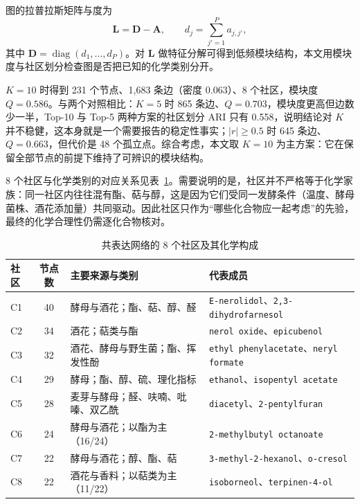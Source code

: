 ﻿\documentclass[UTF8,a4paper,zihao=-4]{ctexart}
\numberwithin{figure}{section}
\numberwithin{table}{section}
\numberwithin{equation}{section}
\newcommand{\file}[1]{\texttt{#1}}
\newcommand{\bA}{\bm{A}}
\newcommand{\bD}{\bm{D}}
\newcommand{\bL}{\bm{L}}
\begin{document}
图的拉普拉斯矩阵与度为
\begin{equation}
\bL=\bD-\bA,\qquad d_j=\sum_{j'=1}^{P}a_{j,j'},
\label{eq:laplacian}
\end{equation}
其中 $\bD=\operatorname{diag}(d_1,\dots,d_P)$。对 $\bL$ 做特征分解可得到低频模块结构\cite{langfelder2008}，本文用模块度与社区划分检查图是否把已知的化学类别分开。

$K=10$ 时得到 231 个节点、1{,}683 条边（密度 0.063）、8 个社区，模块度 $Q=0.586$。与两个对照相比：$K=5$ 时 865 条边、$Q=0.703$，模块度更高但边数少一半，Top-10 与 Top-5 两种方案的社区划分 ARI 只有 0.558，说明结论对 $K$ 并不稳健，这本身就是一个需要报告的稳定性事实；$|r|\ge0.5$ 时 645 条边、$Q=0.663$，但代价是 48 个孤立点。综合考虑，本文取 $K=10$ 为主方案：它在保留全部节点的前提下维持了可辨识的模块结构。

8 个社区与化学类别的对应关系见表~\ref{tab:q2-comm}。需要说明的是，社区并不严格等于化学家族：同一社区内往往混有酯、萜与醇，这是因为它们受同一发酵条件（温度、酵母菌株、酒花添加量）共同驱动。因此社区只作为“哪些化合物应一起考虑”的先验，最终的化学合理性仍需逐化合物核对。

\begin{table}[H]
  \centering
  \caption{共表达网络的 8 个社区及其化学构成}
  \label{tab:q2-comm}
  \small
  \begin{tabularx}{\textwidth}{@{}l c >{\hsize=0.9\hsize\raggedright\arraybackslash}X >{\hsize=1.1\hsize\raggedright\arraybackslash}X@{}}
    \toprule
    社区 & 节点数 & 主要来源与类别 & 代表成员 \\
    \midrule
    C1 & 40 & 酵母与酒花；酯、萜、醇、醛 & \file{E-nerolidol}、\file{2,3-dihydrofarnesol} \\
    C2 & 34 & 酒花；萜类与酯 & \file{nerol oxide}、\file{epicubenol} \\
    C3 & 32 & 酒花、酵母与野生菌；酯、挥发性酚 & \file{ethyl phenylacetate}、\file{neryl formate} \\
    C4 & 29 & 酵母；酯、醇、硫、理化指标 & \file{ethanol}、\file{isopentyl acetate} \\
    C5 & 28 & 麦芽与酵母；醛、呋喃、吡嗪、双乙酰 & \file{diacetyl}、\file{2-pentylfuran} \\
    C6 & 24 & 酵母与酒花；以酯为主（16/24） & \file{2-methylbutyl octanoate} \\
    C7 & 22 & 酵母与酒花；醇、酯、萜 & \file{3-methyl-2-hexanol}、\file{o-cresol} \\
    C8 & 22 & 酒花与香料；以萜类为主（11/22） & \file{isoborneol}、\file{terpinen-4-ol} \\
    \bottomrule
  \end{tabularx}
\end{table}
\end{document}

